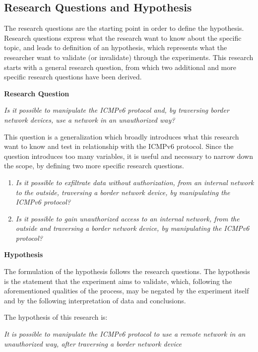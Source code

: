 \documentclass[12pt]{article}
\begin{document}
\subsection{Research Questions and Hypothesis}
\label{sub:reearchQandH}

The research questions are the starting point in order to define the hypothesis. Research questions express what the research want to know about the specific topic, and leads to definition of an hypothesis, which represents what the researcher want to validate (or invalidate) through the experiments. This research starts with a general research question, from which two additional and more specific research questions have been derived.

\textbf{Research Question}
\label{subsub:researchQ}

\textit{Is it possible to manipulate the ICMPv6 protocol and, by traversing border network devices, use  a network in an unauthorized way?}

This question is a generalization which broadly introduces what this research want to know and test in relationship with the ICMPv6 protocol. Since the question introduces too many variables, it is useful and necessary to narrow down the scope, by defining two more specific research questions.
\vspace{-10pt}
\begin{enumerate}
 \item \textit{Is it possible to exfiltrate data without authorization, from an internal network to the outside, traversing a border network device, by manipulating the ICMPv6 protocol?}
 \item \textit{Is it possible to gain unauthorized access to an internal network, from the outside and traversing a border network device, by manipulating the ICMPv6 protocol?}
\end{enumerate}

\textbf{Hypothesis}
\label{subsub:hypothesis}

The formulation of the hypothesis follows the research questions. The hypothesis is the statement that the experiment aims to validate, which, following the aforementioned qualities of the process, may be negated by the experiment itself and by the following interpretation of data and conclusions.

The hypothesis of this research is:

\textit{It is possible to manipulate the ICMPv6 protocol to use a remote network in an unauthorized way, after traversing a border network device}
\end{document}
